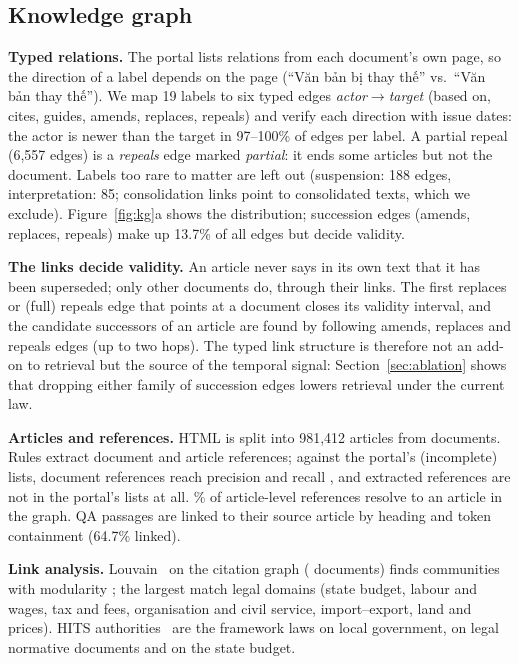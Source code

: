 \documentclass{article} %
\begin{document}
\subsection{Knowledge graph}
\label{sec:kg}
\textbf{Typed relations.} The portal lists relations from each document's own page, so the direction of a label depends
on the page (``Văn bản bị thay thế'' vs.\ ``Văn bản thay thế''). We map 19 labels to six typed edges
\emph{actor$\to$target} (based on, cites, guides, amends, replaces, repeals) and verify each direction with issue
dates: the actor is newer than the target in 97--100\% of edges per label. A partial repeal (6,557 edges) is a
\emph{repeals} edge marked \emph{partial}: it ends some articles but not the document. Labels too rare to matter are
left out (suspension: 188 edges, interpretation: 85; consolidation links point to consolidated texts, which we exclude).
Figure~\ref{fig:kg}a shows the distribution; succession edges (amends, replaces, repeals) make up 13.7\% of all edges
but decide validity.

\textbf{The links decide validity.} An article never says in its own text that it has been superseded; only other
documents do, through their links. The first replaces or (full) repeals edge that points at a document closes its validity
interval, and the candidate successors of an article are found by following amends, replaces and repeals edges (up to
two hops). The typed link structure is therefore not an add-on to retrieval but the source of the temporal signal:
Section~\ref{sec:ablation} shows that dropping either family of succession edges lowers retrieval under the current law.

\textbf{Articles and references.} HTML is split into 981,412 articles from \KgDocsWithArticles{} documents. Rules extract
document and article references; against the portal's (incomplete) lists, document references reach precision \KgXrefP{}
and recall \KgXrefR{}, and \KgXrefNew{} extracted references are not in the portal's lists at all. \KgArtXrefRes\% of
\KgArtXref{} article-level references resolve to an article in the graph. QA passages are linked to their source article
by heading and token containment (64.7\% linked).

\textbf{Link analysis.} Louvain~\citep{blondel2008louvain} on the citation graph (\KgLouvainNodes{} documents) finds
\KgLouvainComm{} communities with modularity \KgLouvainMod{}; the largest match legal domains (state budget,
labour and wages, tax and fees, organisation and civil service, import--export, land and prices). HITS
authorities~\citep{kleinberg1999hits} are the framework laws on local government, on legal normative documents and on
the state budget.
\end{document}
